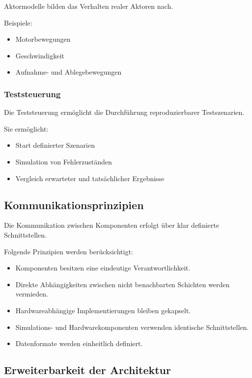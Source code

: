 Aktormodelle bilden das Verhalten realer Aktoren nach.

Beispiele:

\begin{itemize}
\tightlist
\item
  Motorbewegungen
\item
  Geschwindigkeit
\item
  Aufnahme- und Ablegebewegungen
\end{itemize}

\subsubsection{Teststeuerung}\label{teststeuerung}

Die Teststeuerung ermöglicht die Durchführung reproduzierbarer
Testszenarien.

Sie ermöglicht:

\begin{itemize}
\tightlist
\item
  Start definierter Szenarien
\item
  Simulation von Fehlerzuständen
\item
  Vergleich erwarteter und tatsächlicher Ergebnisse
\end{itemize}

\subsection{Kommunikationsprinzipien}\label{kommunikationsprinzipien}

Die Kommunikation zwischen Komponenten erfolgt über klar definierte
Schnittstellen.

Folgende Prinzipien werden berücksichtigt:

\begin{itemize}
\tightlist
\item
  Komponenten besitzen eine eindeutige Verantwortlichkeit.
\item
  Direkte Abhängigkeiten zwischen nicht benachbarten Schichten werden
  vermieden.
\item
  Hardwareabhängige Implementierungen bleiben gekapselt.
\item
  Simulations- und Hardwarekomponenten verwenden identische
  Schnittstellen.
\item
  Datenformate werden einheitlich definiert.
\end{itemize}

\subsection{Erweiterbarkeit der
Architektur}\label{erweiterbarkeit-der-architektur}

